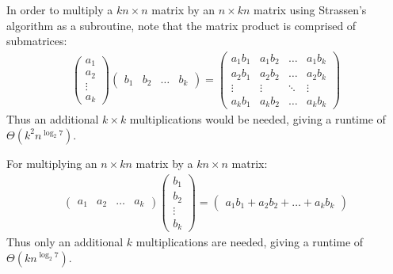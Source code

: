 In order to multiply a $k n \times n$ matrix by an $n \times k n$ matrix using Strassen's algorithm as a subroutine, note that the matrix product is comprised of submatrices:
\begin{eqnarray*}
\left (
	\begin{array}{c}
	a_1 \\
	a_2 \\
	\vdots \\
	a_k
	\end{array}
\right )
\left (
	\begin{array}{cccc}
	b_1 & b_2 & \ldots & b_k
	\end{array}
\right )
=
\left (
	\begin{array}{cccc}
	a_1 b_1 & a_1 b_2 & \ldots & a_1 b_k \\
	a_2 b_1 & a_2 b_2 & \ldots & a_2 b_k \\
	\vdots  & \vdots  & \ddots & \vdots \\
	a_k b_1 & a_k b_2 & \ldots & a_k b_k
	\end{array}
\right )
\end{eqnarray*}
Thus an additional $k \times k$ multiplications would be needed, giving a runtime of $\Theta(k^2 n^{\log_2{7}})$.

For multiplying an $n \times k n$ matrix by a $k n \times n$ matrix:
\begin{eqnarray*}
\left (
	\begin{array}{cccc}
	a_1 & a_2 & \ldots & a_k
	\end{array}
\right )
\left (
	\begin{array}{c}
	b_1 \\
	b_2 \\
	\vdots \\
	b_k
	\end{array}
\right )
=
\left (
	\begin{array}{c}
	a_1 b_1 + a_2 b_2 + \ldots + a_k b_k
	\end{array}
\right )
\end{eqnarray*}
Thus only an additional $k$ multiplications are needed, giving a runtime of $\Theta(k n^{\log_2{7}})$.
